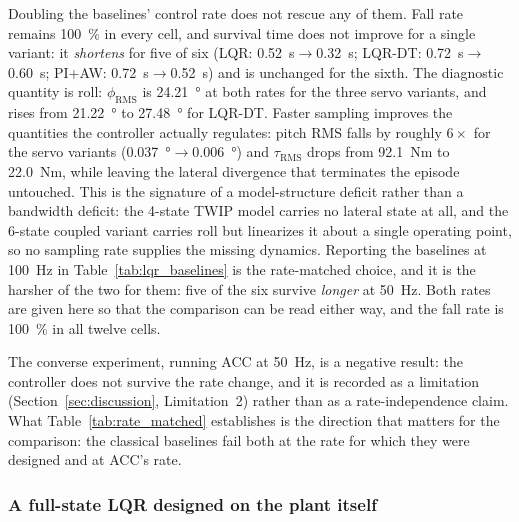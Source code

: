 \documentclass[a4paper,fleqn]{cas-dc}
\begin{document}
Doubling the baselines' control rate does not rescue any of them. Fall rate remains \SI{100}{\percent} in every cell, and survival time does not improve for a single variant: it \emph{shortens} for five of six (LQR: \SI{0.52}{s}$\rightarrow$\SI{0.32}{s}; LQR-DT: \SI{0.72}{s}$\rightarrow$\SI{0.60}{s}; PI+AW: \SI{0.72}{s}$\rightarrow$\SI{0.52}{s}) and is unchanged for the sixth. The diagnostic quantity is roll: $\phi_{\text{RMS}}$ is \SI{24.21}{\degree} at both rates for the three servo variants, and rises from \SI{21.22}{\degree} to \SI{27.48}{\degree} for LQR-DT. Faster sampling improves the quantities the controller actually regulates: pitch RMS falls by roughly $6{\times}$ for the servo variants (\SI{0.037}{\degree}$\rightarrow$\SI{0.006}{\degree}) and $\tau_{\text{RMS}}$ drops from \SI{92.1}{Nm} to \SI{22.0}{Nm}, while leaving the lateral divergence that terminates the episode untouched. This is the signature of a model-structure deficit rather than a bandwidth deficit: the 4-state TWIP model carries no lateral state at all, and the 6-state coupled variant carries roll but linearizes it about a single operating point, so no sampling rate supplies the missing dynamics. Reporting the baselines at \SI{100}{Hz} in Table~\ref{tab:lqr_baselines} is the rate-matched choice, and it is the harsher of the two for them: five of the six survive \emph{longer} at \SI{50}{Hz}. Both rates are given here so that the comparison can be read either way, and the fall rate is \SI{100}{\percent} in all twelve cells.

The converse experiment, running ACC at \SI{50}{Hz}, is a negative result: the controller does not survive the rate change, and it is recorded as a limitation (Section~\ref{sec:discussion}, Limitation~2) rather than as a rate-independence claim. What Table~\ref{tab:rate_matched} establishes is the direction that matters for the comparison: the classical baselines fail both at the rate for which they were designed and at ACC's rate.

\subsubsection{A full-state LQR designed on the plant itself}
\label{sec:full_state_lqr}
\end{document}
